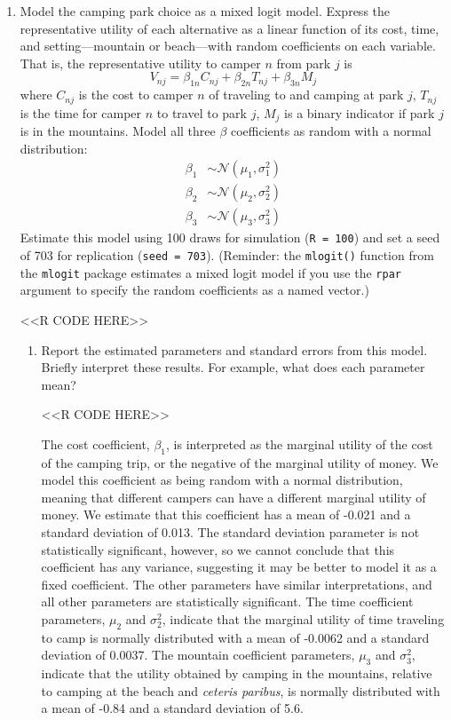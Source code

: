 \documentclass[11pt,letterpaper]{article}
\begin{document}
\begin{enumerate}[label=\alph*., leftmargin=*]

	\item Model the camping park choice as a mixed logit model. Express the representative utility of each alternative as a linear function of its cost, time, and setting---mountain or beach---with random coefficients on each variable. That is, the representative utility to camper $n$ from park $j$ is
	$$V_{nj} = \beta_{1n} C_{nj} + \beta_{2n} T_{nj} + \beta_{3n} M_j$$
	where $C_{nj}$ is the cost to camper $n$ of traveling to and camping at park $j$, $T_{nj}$ is the time for camper $n$ to travel to park $j$, $M_j$ is a binary indicator if park $j$ is in the mountains. Model all three $\beta$ coefficients as random with a normal distribution:
	\begin{align*}
		\beta_1 & \sim \mathcal{N}(\mu_1, \sigma_1^2) \\
		\beta_2 & \sim \mathcal{N}(\mu_2, \sigma_2^2) \\
		\beta_3 & \sim \mathcal{N}(\mu_3, \sigma_3^2)
	\end{align*}
	Estimate this model using 100 draws for simulation (\texttt{R = 100}) and set a seed of 703 for replication (\texttt{seed = 703}). (Reminder: the \texttt{mlogit()} function from the \texttt{mlogit} package estimates a mixed logit model if you use the \texttt{rpar} argument to specify the random coefficients as a named vector.)

	<<R CODE HERE>>

	\begin{enumerate}[label=\roman*.]
		\item Report the estimated parameters and standard errors from this model. Briefly interpret these results. For example, what does each parameter mean?

		<<R CODE HERE>>

		The cost coefficient, $\beta_1$, is interpreted as the marginal utility of the cost of the camping trip, or the negative of the marginal utility of money. We model this coefficient as being random with a normal distribution, meaning that different campers can have a different marginal utility of money. We estimate that this coefficient has a mean of -0.021 and a standard deviation of 0.013. The standard deviation parameter is not statistically significant, however, so we cannot conclude that this coefficient has any variance, suggesting it may be better to model it as a fixed coefficient. The other parameters have similar interpretations, and all other parameters are statistically significant. The time coefficient parameters, $\mu_2$ and $\sigma_2^2$, indicate that the marginal utility of time traveling to camp is normally distributed with a mean of -0.0062 and a standard deviation of 0.0037. The mountain coefficient parameters, $\mu_3$ and $\sigma_3^2$, indicate that the utility obtained by camping in the mountains, relative to camping at the beach and \emph{ceteris paribus}, is normally distributed with a mean of -0.84 and a standard deviation of 5.6.
	\end{enumerate}


\end{enumerate}
\end{document}
